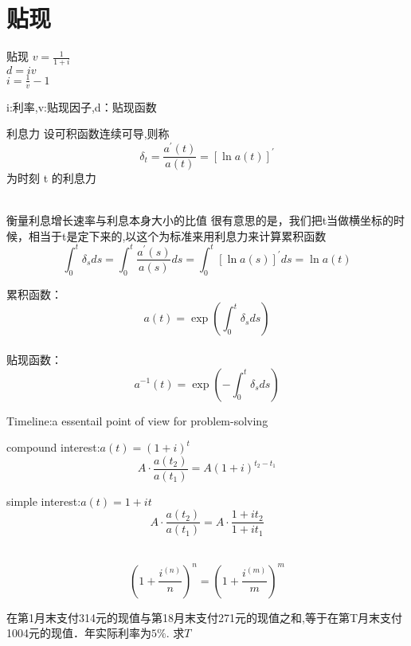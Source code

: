 	\section{贴现}
	\begin{definition}{贴现}
\noindent	$v=\frac{1}{1+i}$ \\ $d=iv$\\ $i=\frac{1}{v}-1$
	\end{definition}
\begin{note}
i:利率,v:贴现因子,d：贴现函数
\end{note}
\begin{definition}{利息力}
\noindent		设可积函数连续可导,则称
\[
\delta_{t}=\frac{a^{\prime}(t)}{a(t)}=[\ln a(t)]^{\prime}
\]
为时刻 t 的利息力
		\end{definition}
		\\ 衡量利息增长速率与利息本身大小的比值
		很有意思的是，我们把t当做横坐标的时候，相当于t是定下来的,以这个为标准来用利息力来计算累积函数
		$$\int_{0}^{t} \delta_{s} d s=\int_{0}^{t} \frac{a^{\prime}(s)}{a(s)} d s=\int_{0}^{t}[\ln a(s)]^{\prime} d s=\ln a(t)$$
\begin{property}
	累积函数：\\
\[
a(t)=\exp \left(\int_{0}^{t} \delta_{s} d s\right)
\]\\
 贴现函数：\\
\[
a^{-1}(t)=\exp \left(-\int_{0}^{t} \delta_{s} d s\right)
\]
	\end{property}
Timeline:a essentail point of view for problem-solving \\
\begin{example}
compound interest:$a(t)=(1+i)^t$\\
$$A \cdot \frac{a\left(t_{2}\right)}{a\left(t_{1}\right)}=A(1+i)^{t_{2}-t_{1}}$$
\end{example}
\begin{example}
simple interest:$a(t)=1+it$\\
$$A \cdot \frac{a\left(t_{2}\right)}{a\left(t_{1}\right)}=A \cdot \frac{1+i t_{2}}{1+i t_{1}}$$
\end{example}
\
$$(1+\frac{i^{(n)}}{n})^{n}=(1+\frac{i^{(m)}}{m})^{m}$$
\begin{exercise}
	在第1月末支付314元的现值与第18月末支付271元的现值之和,等于在第T月末支付1004元的现值．年实际利率为$5\%$. 求$T$
\end{exercise}